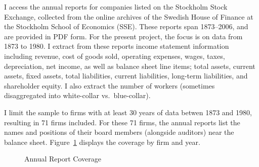 \documentclass[
]{article}
\begin{document}
I access the annual reports for companies listed on the Stockholm Stock
Exchange, collected from the online archives of the Swedish House of
Finance at the Stockholm School of Economics (SSE). These reports span
1873--2006, and are provided in PDF form. For the present project, the
focus is on data from 1873 to 1980. I extract from these reports income
statement information including revenue, cost of goods sold, operating
expenses, wages, taxes, depreciation, net income, as well as balance
sheet line items; total assets, current assets, fixed assets, total
liabilities, current liabilities, long-term liabilities, and shareholder
equity. I also extract the number of workers (sometimes disaggregated
into white-collar vs.~blue-collar).

I limit the sample to firms with at least 30 years of data betwen 1873
and 1980, resulting in 71 firms included. For these 71 firms, the annual
reports list the names and positions of their board members (alongside
auditors) near the balance sheet. Figure~\ref{fig-crot} displays the
coverage by firm and year.

\begin{figure}


\caption{\label{fig-crot}Annual Report Coverage}

\end{figure}%
\end{document}
